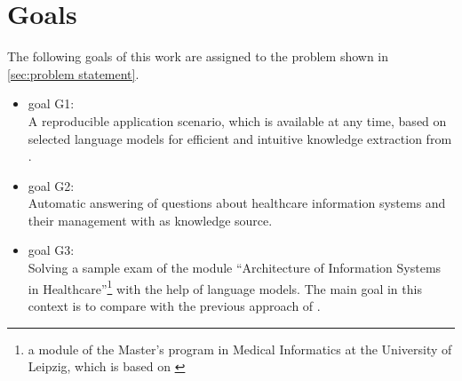 \section{Goals}\label{sec:goals}
The following goals of this work are assigned to the problem shown in \cref{sec:problem statement}.
\begin{itemize}
  \item goal G1:\\
    A reproducible application scenario, which is available at any time, based on selected language models for efficient and intuitive knowledge extraction from \citet{bb2}.
   \item goal G2:\\
    Automatic answering of questions about healthcare information systems and their management with \citet{bb2} as knowledge source.
  \item goal G3:\\
   Solving a sample exam of the module \enquote{Architecture of Information Systems in Healthcare}\footnote{\raggedright{}a module of the Master's program in Medical Informatics at the University of Leipzig, which is based on \citet{bb2}} with the help of language models.
   The main goal in this context is to compare with the previous approach of \citet{Paul_Keller}.
   
\end{itemize}
